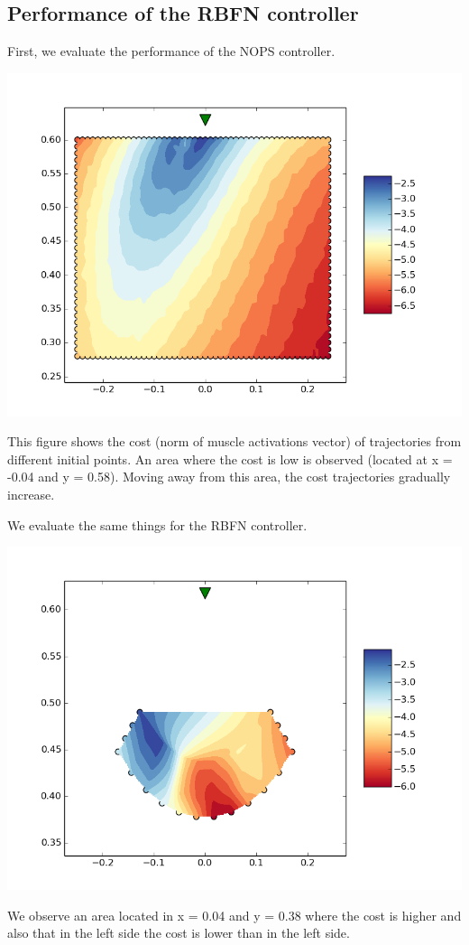 \documentclass[pdftex,a4paper,12pt]{report}
\begin{document}
\subsection{Performance of the RBFN controller}
First, we evaluate the performance of the NOPS controller.
\begin{center}
\includegraphics[scale=0.5]{figures/costMapBrent.png}
\end{center}
This figure shows the cost (norm of muscle activations vector) of trajectories from different initial points.
An area where the cost is low is observed (located at x = -0.04 and y = 0.58). Moving away from this area, the cost trajectories gradually increase.

We evaluate the same things for the RBFN controller.
\begin{center}
\includegraphics[scale=0.5]{figures/costMapRBFNShuffle1.png}
\end{center}
We observe an area located in x = 0.04 and y = 0.38 where the cost is higher and also that in the left side the cost is lower than in the left side.
\end{document}
